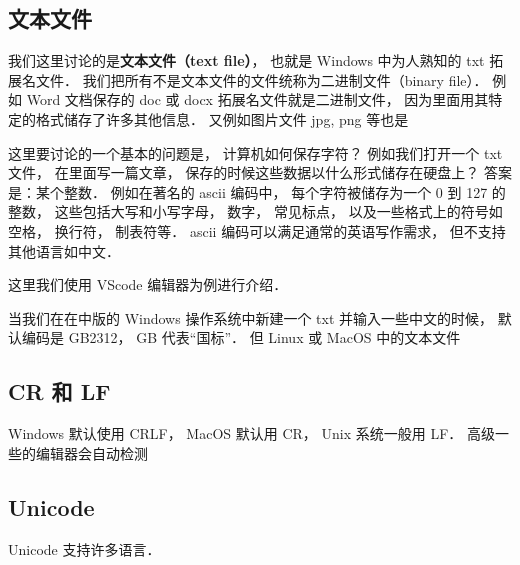 
\subsection{文本文件}
我们这里讨论的是\textbf{文本文件（text file）}， 也就是 Windows 中为人熟知的 txt 拓展名文件． 我们把所有不是文本文件的文件统称为二进制文件（binary file）． 例如 Word 文档保存的 doc 或 docx 拓展名文件就是二进制文件， 因为里面用其特定的格式储存了许多其他信息．  又例如图片文件 jpg, png 等也是

这里要讨论的一个基本的问题是， 计算机如何保存字符？ 例如我们打开一个 txt 文件， 在里面写一篇文章， 保存的时候这些数据以什么形式储存在硬盘上？ 答案是：某个整数． 例如在著名的 ascii 编码中， 每个字符被储存为一个 0 到 127 的整数， 这些包括大写和小写字母， 数字， 常见标点， 以及一些格式上的符号如空格， 换行符， 制表符等． ascii 编码可以满足通常的英语写作需求， 但不支持其他语言如中文．



这里我们使用 VScode 编辑器为例进行介绍． 

当我们在在中版的 Windows 操作系统中新建一个 txt 并输入一些中文的时候， 默认编码是 GB2312， GB 代表“国标”． 但 Linux 或 MacOS 中的文本文件

\subsection{CR 和 LF}
Windows 默认使用 CRLF， MacOS 默认用 CR， Unix 系统一般用 LF． 高级一些的编辑器会自动检测

\subsection{Unicode}
Unicode 支持许多语言．
